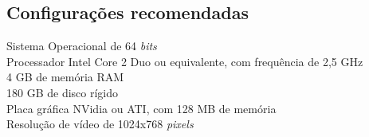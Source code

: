 \subsection{Configurações recomendadas}
Sistema Operacional de 64 \textit{bits}\\
Processador Intel Core 2 Duo ou equivalente, com frequência de 2,5 GHz\\
4 GB de memória RAM\\
180 GB de disco rígido\\
Placa gráfica NVidia ou ATI, com 128 MB de memória\\
Resolução de vídeo de 1024x768 \textit{pixels}

